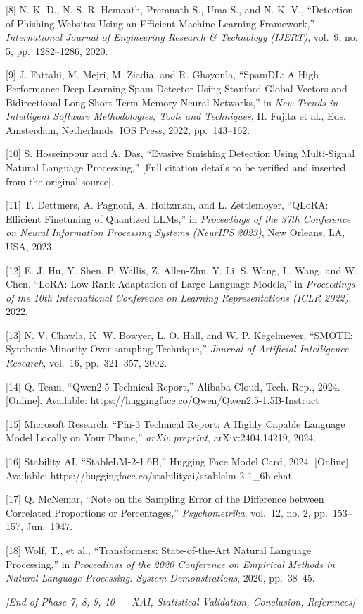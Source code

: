 {[}8{]} N. K. D., N. S. R. Hemanth, Premnath S., Uma S., and N. K. V.,
``Detection of Phishing Websites Using an Efficient Machine Learning
Framework,'' \emph{International Journal of Engineering Research \&
Technology (IJERT)}, vol.~9, no. 5, pp.~1282--1286, 2020.

{[}9{]} J. Fattahi, M. Mejri, M. Ziadia, and R. Ghayoula, ``SpamDL: A
High Performance Deep Learning Spam Detector Using Stanford Global
Vectors and Bidirectional Long Short-Term Memory Neural Networks,'' in
\emph{New Trends in Intelligent Software Methodologies, Tools and
Techniques}, H. Fujita et al., Eds. Amsterdam, Netherlands: IOS Press,
2022, pp.~143--162.

{[}10{]} S. Hosseinpour and A. Das, ``Evasive Smishing Detection Using
Multi-Signal Natural Language Processing,'' {[}Full citation details to
be verified and inserted from the original source{]}.

{[}11{]} T. Dettmers, A. Pagnoni, A. Holtzman, and L. Zettlemoyer,
``QLoRA: Efficient Finetuning of Quantized LLMs,'' in \emph{Proceedings
of the 37th Conference on Neural Information Processing Systems (NeurIPS
2023)}, New Orleans, LA, USA, 2023.

{[}12{]} E. J. Hu, Y. Shen, P. Wallis, Z. Allen-Zhu, Y. Li, S. Wang, L.
Wang, and W. Chen, ``LoRA: Low-Rank Adaptation of Large Language
Models,'' in \emph{Proceedings of the 10th International Conference on
Learning Representations (ICLR 2022)}, 2022.

{[}13{]} N. V. Chawla, K. W. Bowyer, L. O. Hall, and W. P. Kegelmeyer,
``SMOTE: Synthetic Minority Over-sampling Technique,'' \emph{Journal of
Artificial Intelligence Research}, vol.~16, pp.~321--357, 2002.

{[}14{]} Q. Team, ``Qwen2.5 Technical Report,'' Alibaba Cloud, Tech.
Rep., 2024. {[}Online{]}. Available:
https://huggingface.co/Qwen/Qwen2.5-1.5B-Instruct

{[}15{]} Microsoft Research, ``Phi-3 Technical Report: A Highly Capable
Language Model Locally on Your Phone,'' \emph{arXiv preprint},
arXiv:2404.14219, 2024.

{[}16{]} Stability AI, ``StableLM-2-1.6B,'' Hugging Face Model Card,
2024. {[}Online{]}. Available:
https://huggingface.co/stabilityai/stablelm-2-1\_6b-chat

{[}17{]} Q. McNemar, ``Note on the Sampling Error of the Difference
between Correlated Proportions or Percentages,'' \emph{Psychometrika},
vol.~12, no. 2, pp.~153--157, Jun.~1947.

{[}18{]} Wolf, T., et al., ``Transformers: State-of-the-Art Natural
Language Processing,'' in \emph{Proceedings of the 2020 Conference on
Empirical Methods in Natural Language Processing: System
Demonstrations}, 2020, pp.~38--45.

\emph{{[}End of Phase 7, 8, 9, 10 --- XAI, Statistical Validation,
Conclusion, References{]}}
